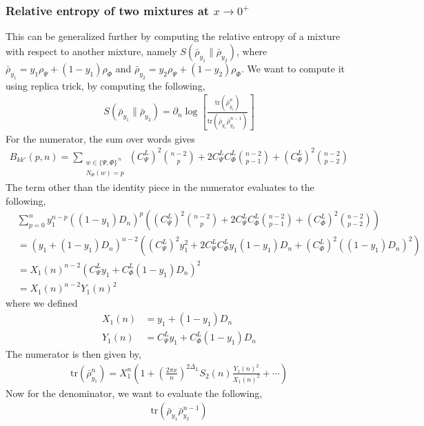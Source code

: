 \documentclass[11pt]{article}
\newcommand{\p}{\partial}
\newcommand{\lb}{\left(}
\newcommand{\rb}{\right)}
\begin{document}
\subsubsection{\texorpdfstring{Relative entropy of two mixtures at $x\to 0^+$}
{Relative entropy of two mixtures at x -> 0+}}

This can be generalized further by computing the relative entropy of a mixture with respect to another mixture, namely $S(\bar{\rho}_{y_1} \| \bar{\rho}_{y_2} )$, where $\bar{\rho}_{y_1}=y_1\rho_\Psi+(1-y_1)\rho_\Phi$ and $\bar{\rho}_{y_2}=y_2\rho_\Psi+(1-y_2)\rho_\Phi$. 
We want to compute it using replica trick, by computing the following,
\begin{align}
    S(\bar{\rho}_{y_1} \| \bar{\rho}_{y_2} ) = \p_n \log \left[\frac{\text{tr}(\bar{\rho}_{y_1}^n)}{\text{tr}(\bar{\rho}_{y_1}\bar{\rho}_{y_2}^{n-1})}\right]
\end{align}
For the numerator, the sum over words gives
\begin{align}
    B_{kk'}(p,n) = \sum_{\substack{w\in\{\Psi,\Phi\}^{\,n}\\ N_\Phi(w)=p}} {(C_\Psi^L)}^2 \binom{n-2}{p} + 2C_\Psi^L C_\Phi^L \binom{n-2}{p-1} +{(C_\Phi^L)}^2\binom{n-2}{p-2}
\end{align}
The term other than the identity piece in the numerator evaluates to the following,
\begin{align}
    & \sum_{p=0}^{n} y_1^{n-p} \lb (1-y_1)D_n\rb^p\lb {(C_\Psi^L)}^2 \binom{n-2}{p} + 2C_\Psi^L C_\Phi^L \binom{n-2}{p-1} +{(C_\Phi^L)}^2\binom{n-2}{p-2} \rb \\
    &= \lb y_1+ (1-y_1 )D_n\rb^{n-2} \lb {(C_\Psi^L)}^2 y_1^2 + 2C_\Psi^L C_\Phi^L y_1(1-y_1)D_n + {(C_\Phi^L)}^2 ((1-y_1)D_n)^2  \rb \\
    &= X_1(n)^{n-2} \lb C_\Psi^L y_1 + C_\Phi^L(1-y_1)D_n \rb^2 \\
    &= X_1(n)^{n-2}Y_1(n)^{2}
\end{align}
where we defined
\begin{align}
    X_1(n) &= y_1 + (1-y_1)D_n \\
    Y_1(n) &=  C_\Psi^L y_1 + C_\Phi^L(1-y_1)D_n 
\end{align}
The numerator is then given by,
\begin{align}
    \text{tr}(\bar{\rho}_{y_1}^n) = X_1^n\lb1 + \lb\frac{2\pi x}{n}\rb^{2\Delta_L} S_2(n) \frac{Y_1(n)^2}{X_1(n)^2} + \cdots \rb
\end{align}
Now for the denominator, we want to evaluate the following, 
\begin{align}
    \text{tr}\lb \bar{\rho}_{y_1}\bar{\rho}_{y_2}^{n-1}  \rb
\end{align}
\end{document}
